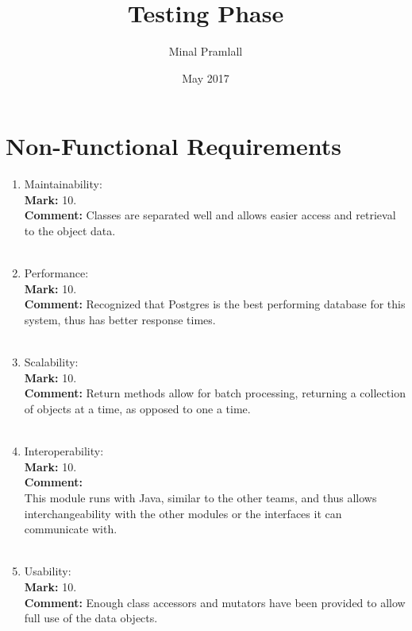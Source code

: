\documentclass{article}
\title{Testing Phase}
\author{Minal Pramlall}
\date{May 2017}
\begin{document}
\maketitle

\section{Non-Functional Requirements}

\begin{enumerate}
    \item Maintainability:\\
    \textbf{Mark: }
    10.\\
    \textbf{Comment:}
    Classes are separated well and allows easier access and retrieval to the object data.\\ \\
    
    \item Performance:\\
    \textbf{Mark: }
    10.\\
    \textbf{Comment:}
    Recognized that Postgres is the best performing database for this system, thus has better response times.\\ \\
    
    \item Scalability:\\
    \textbf{Mark: }
    10.\\
    \textbf{Comment:}
    Return methods allow for batch processing, returning a collection of objects at a time, as opposed to one a time.\\ \\
    
    \item Interoperability:\\
    \textbf{Mark: }
    10.\\
    \textbf{Comment:}\\
    This module runs with Java, similar to the other teams, and thus allows interchangeability with the other modules or the interfaces it can communicate with.\\ \\
    
    \item Usability:\\
    \textbf{Mark: }
    10.\\
    \textbf{Comment:}
    Enough class accessors and mutators have been provided to allow full use of the data objects.\\ \\
    

\end{enumerate}
\end{document}
